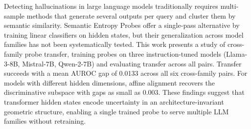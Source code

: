 
Detecting hallucinations in large language models traditionally requires multi-sample methods that generate several outputs per query and cluster them by semantic similarity. Semantic Entropy Probes offer a single-pass alternative by training linear classifiers on hidden states, but their generalization across model families has not been systematically tested. This work presents a study of cross-family probe transfer, training probes on three instruction-tuned models (Llama-3-8B, Mistral-7B, Qwen-2-7B) and evaluating transfer across all pairs. Transfer succeeds with a mean AUROC gap of 0.0133 across all six cross-family pairs. For models with different hidden dimensions, affine alignment recovers the discriminative subspace with gaps as small as 0.003. These findings suggest that transformer hidden states encode uncertainty in an architecture-invariant geometric structure, enabling a single trained probe to serve multiple LLM families without retraining.
